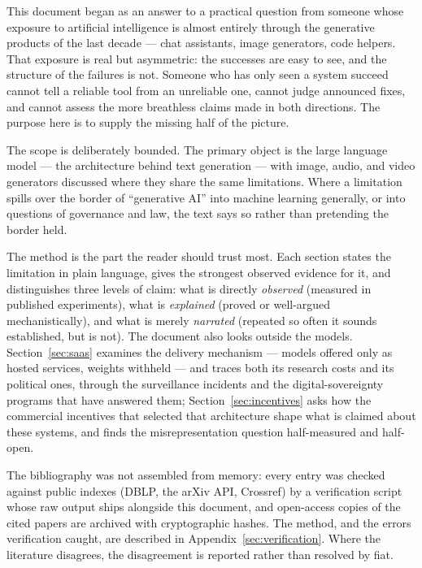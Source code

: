 \documentclass[11pt,a4paper]{article}
\begin{document}
This document began as an answer to a practical question from someone whose
exposure to artificial intelligence is almost entirely through the generative
products of the last decade --- chat assistants, image generators, code
helpers. That exposure is real but asymmetric: the successes are easy to see,
and the structure of the failures is not. Someone who has only seen a system
succeed cannot tell a reliable tool from an unreliable one, cannot judge
announced fixes, and cannot assess the more breathless claims made in both
directions. The purpose here is to supply the missing half of the picture.

The scope is deliberately bounded. The primary object is the large language
model --- the architecture behind text generation --- with image, audio, and
video generators discussed where they share the same limitations. Where a
limitation spills over the border of ``generative AI'' into machine learning
generally, or into questions of governance and law, the text says so rather
than pretending the border held.

The method is the part the reader should trust most. Each section states the
limitation in plain language, gives the strongest observed evidence for it,
and distinguishes three levels of claim: what is directly \emph{observed}
(measured in published experiments), what is \emph{explained} (proved or
well-argued mechanistically), and what is merely \emph{narrated} (repeated so
often it sounds established, but is not). The document also looks outside the models. Section~\ref{sec:saas} examines
the delivery mechanism --- models offered only as hosted services, weights
withheld --- and traces both its research costs and its political ones,
through the surveillance incidents and the digital-sovereignty programs that
have answered them; Section~\ref{sec:incentives} asks how the commercial
incentives that selected that architecture shape what is claimed about these
systems, and finds the misrepresentation question half-measured and half-open.

The bibliography was not assembled
from memory: every entry was checked against public indexes (DBLP, the arXiv
API, Crossref) by a verification script whose raw output ships alongside this
document, and open-access copies of the cited papers are archived with
cryptographic hashes. The method, and the errors verification caught, are
described in Appendix~\ref{sec:verification}. Where the literature
disagrees, the disagreement is reported rather than resolved by fiat.
\end{document}
